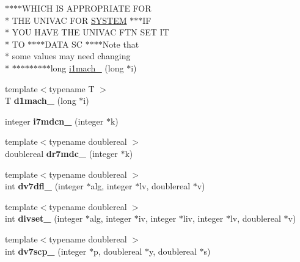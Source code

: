 \begin{DoxyCompactItemize}
$\ast$$\ast$$\ast$$\ast$W\+H\+I\+C\+H I\+S A\+P\+P\+R\+O\+P\+R\+I\+A\+T\+E F\+O\+R \\*
T\+H\+E U\+N\+I\+V\+A\+C F\+O\+R \hyperlink{namespaceport_afa2500030514bcf24109353ab42bf64f}{S\+Y\+S\+T\+E\+M} $\ast$$\ast$$\ast$I\+F \\*
Y\+O\+U H\+A\+V\+E T\+H\+E U\+N\+I\+V\+A\+C F\+T\+N S\+E\+T I\+T \\*
T\+O $\ast$$\ast$$\ast$$\ast$D\+A\+T\+A S\+C $\ast$$\ast$$\ast$$\ast$Note that \\*
some values may need changing \\*
$\ast$$\ast$$\ast$$\ast$$\ast$$\ast$$\ast$$\ast$$\ast$long \hyperlink{namespaceport_a9c7c00af5084ab5bd87acec3fd2295f4}{i1mach\+\_\+} (long $\ast$i)
\item 
\hypertarget{namespaceport_a9cd1236c19f449215c3199552adebe1f}{{\footnotesize template$<$typename T $>$ }\\T {\bfseries d1mach\+\_\+} (long $\ast$i)}\label{namespaceport_a9cd1236c19f449215c3199552adebe1f}

\item 
\hypertarget{namespaceport_a43230b3875051cc066f2c68d4b027d79}{integer {\bfseries i7mdcn\+\_\+} (integer $\ast$k)}\label{namespaceport_a43230b3875051cc066f2c68d4b027d79}

\item 
\hypertarget{namespaceport_a48d011d5fb17771c4b6b9c245b110a4f}{{\footnotesize template$<$typename doublereal $>$ }\\doublereal {\bfseries dr7mdc\+\_\+} (integer $\ast$k)}\label{namespaceport_a48d011d5fb17771c4b6b9c245b110a4f}

\item 
\hypertarget{namespaceport_acfa3ce2ffaeab37e882295d80dbb5583}{{\footnotesize template$<$typename doublereal $>$ }\\int {\bfseries dv7dfl\+\_\+} (integer $\ast$alg, integer $\ast$lv, doublereal $\ast$v)}\label{namespaceport_acfa3ce2ffaeab37e882295d80dbb5583}

\item 
\hypertarget{namespaceport_a1fe61b3e919ae066ecfb5d8bc25f8dd4}{{\footnotesize template$<$typename doublereal $>$ }\\int {\bfseries divset\+\_\+} (integer $\ast$alg, integer $\ast$iv, integer $\ast$liv, integer $\ast$lv, doublereal $\ast$v)}\label{namespaceport_a1fe61b3e919ae066ecfb5d8bc25f8dd4}

\item 
\hypertarget{namespaceport_a5d4a6a4257471b1b351dcb081ff00f85}{{\footnotesize template$<$typename doublereal $>$ }\\int {\bfseries dv7scp\+\_\+} (integer $\ast$p, doublereal $\ast$y, doublereal $\ast$s)}\label{namespaceport_a5d4a6a4257471b1b351dcb081ff00f85}


\end{DoxyCompactItemize}
